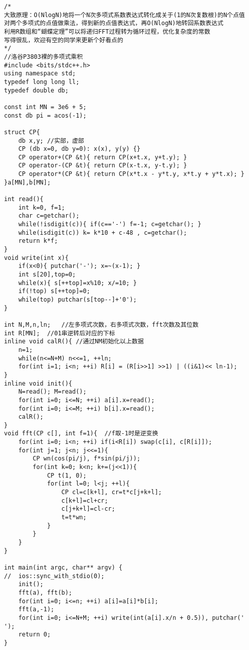\begin{lstlisting}
/* 
大致原理：O(NlogN)地将一个N次多项式系数表达式转化成关于(1的N次复数根)的N个点值
对两个多项式的点值做乘法，得到新的点值表达式，再O(NlogN)地转回系数表达式
利用R数组和“蝴蝶定理”可以将递归FFT过程转为循环过程，优化复杂度的常数
写得很乱，欢迎有空的同学来更新个好看点的
*/
//洛谷P3803裸的多项式乘积
#include <bits/stdc++.h>
using namespace std;
typedef long long ll;
typedef double db;
 
const int MN = 3e6 + 5;
const db pi = acos(-1);

struct CP{
	db x,y;	//实部，虚部
	CP (db x=0, db y=0): x(x), y(y) {}
	CP operator+(CP &t){ return CP(x+t.x, y+t.y); }
	CP operator-(CP &t){ return CP(x-t.x, y-t.y); }
	CP operator*(CP &t){ return CP(x*t.x - y*t.y, x*t.y + y*t.x); }
}a[MN],b[MN];

int read(){
	int k=0, f=1;
	char c=getchar();
	while(!isdigit(c)){ if(c=='-') f=-1; c=getchar(); }
	while(isdigit(c)) k= k*10 + c-48 , c=getchar();
	return k*f;
}
void write(int x){
	if(x<0){ putchar('-'); x=~(x-1); }
	int s[20],top=0;
	while(x){ s[++top]=x%10; x/=10; }
	if(!top) s[++top]=0;
	while(top) putchar(s[top--]+'0');
}

int N,M,n,ln;	//左多项式次数，右多项式次数，fft次数及其位数
int R[MN];	//01串逆转后对应的下标
inline void calR(){	//通过NM初始化以上数据
	n=1;
	while(n<=N+M) n<<=1, ++ln;
	for(int i=1; i<n; ++i) R[i] = (R[i>>1] >>1) | ((i&1)<< ln-1);
}
inline void init(){
	N=read(); M=read();
	for(int i=0; i<=N; ++i) a[i].x=read();
	for(int i=0; i<=M; ++i) b[i].x=read();
	calR();
}
void fft(CP c[], int f=1){	//f取-1时是逆变换
	for(int i=0; i<n; ++i) if(i<R[i]) swap(c[i], c[R[i]]);
	for(int j=1; j<n; j<<=1){
		CP wn(cos(pi/j), f*sin(pi/j));
		for(int k=0; k<n; k+=(j<<1)){
			CP t(1, 0);
			for(int l=0; l<j; ++l){
				CP cl=c[k+l], cr=t*c[j+k+l];
				c[k+l]=cl+cr;
				c[j+k+l]=cl-cr;
				t=t*wn;
			}
		}
	}
}

int main(int argc, char** argv) {
//	ios::sync_with_stdio(0);
	init();
	fft(a), fft(b);
	for(int i=0; i<=n; ++i) a[i]=a[i]*b[i];
	fft(a,-1);
	for(int i=0; i<=N+M; ++i) write(int(a[i].x/n + 0.5)), putchar(' ');
	return 0;
}
\end{lstlisting}